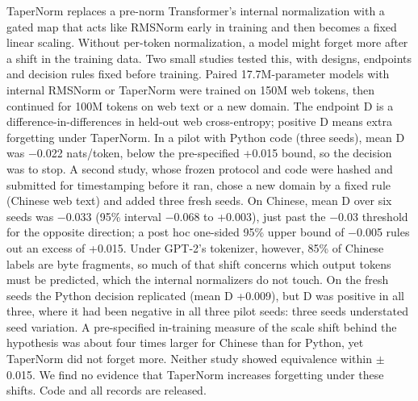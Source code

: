 TaperNorm replaces a pre-norm Transformer's internal normalization with a gated map that acts like RMSNorm early in training and then becomes a fixed linear scaling. Without per-token normalization, a model might forget more after a shift in the training data. Two small studies tested this, with designs, endpoints and decision rules fixed before training. Paired 17.7M-parameter models with internal RMSNorm or TaperNorm were trained on 150M web tokens, then continued for 100M tokens on web text or a new domain. The endpoint D is a difference-in-differences in held-out web cross-entropy; positive D means extra forgetting under TaperNorm. In a pilot with Python code (three seeds), mean D was $-$0.022 nats/token, below the pre-specified +0.015 bound, so the decision was to stop. A second study, whose frozen protocol and code were hashed and submitted for timestamping before it ran, chose a new domain by a fixed rule (Chinese web text) and added three fresh seeds. On Chinese, mean D over six seeds was $-$0.033 (95\% interval $-$0.068 to +0.003), just past the $-$0.03 threshold for the opposite direction; a post hoc one-sided 95\% upper bound of $-$0.005 rules out an excess of +0.015. Under GPT-2's tokenizer, however, 85\% of Chinese labels are byte fragments, so much of that shift concerns which output tokens must be predicted, which the internal normalizers do not touch. On the fresh seeds the Python decision replicated (mean D +0.009), but D was positive in all three, where it had been negative in all three pilot seeds: three seeds understated seed variation. A pre-specified in-training measure of the scale shift behind the hypothesis was about four times larger for Chinese than for Python, yet TaperNorm did not forget more. Neither study showed equivalence within $\pm$0.015. We find no evidence that TaperNorm increases forgetting under these shifts. Code and all records are released.
